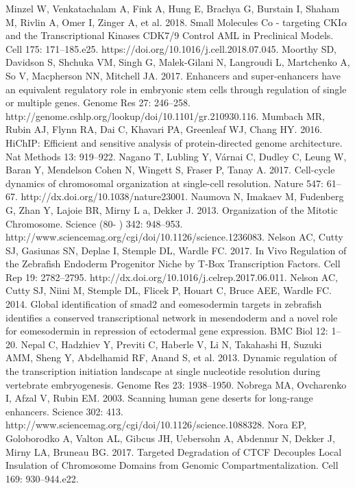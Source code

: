 \begin{thebibliography}{1}
	 Minzel W, Venkatachalam A, Fink A, Hung E, Brachya G, Burstain I, Shaham M, Rivlin A, Omer I, Zinger A, et al. 2018. Small Molecules Co - targeting CKI$\alpha$ and the Transcriptional Kinases CDK7/9 Control AML in Preclinical Models. Cell 175: 171–185.e25. https://doi.org/10.1016/j.cell.2018.07.045.
	 Moorthy SD, Davidson S, Shchuka VM, Singh G, Malek-Gilani N, Langroudi L, Martchenko A, So V, Macpherson NN, Mitchell JA. 2017. Enhancers and super-enhancers have an equivalent regulatory role in embryonic stem cells through regulation of single or multiple genes. Genome Res 27: 246–258. http://genome.cshlp.org/lookup/doi/10.1101/gr.210930.116.
	 Mumbach MR, Rubin AJ, Flynn RA, Dai C, Khavari PA, Greenleaf WJ, Chang HY. 2016. HiChIP: Efficient and sensitive analysis of protein-directed genome architecture. Nat Methods 13: 919–922.
	 Nagano T, Lubling Y, Várnai C, Dudley C, Leung W, Baran Y, Mendelson Cohen N, Wingett S, Fraser P, Tanay A. 2017. Cell-cycle dynamics of chromosomal organization at single-cell resolution. Nature 547: 61–67. http://dx.doi.org/10.1038/nature23001.
	 Naumova N, Imakaev M, Fudenberg G, Zhan Y, Lajoie BR, Mirny L a, Dekker J. 2013. Organization of the Mitotic Chromosome. Science (80- ) 342: 948–953. http://www.sciencemag.org/cgi/doi/10.1126/science.1236083.
	 Nelson AC, Cutty SJ, Gasiunas SN, Deplae I, Stemple DL, Wardle FC. 2017. In Vivo Regulation of the Zebrafish Endoderm Progenitor Niche by T-Box Transcription Factors. Cell Rep 19: 2782–2795. http://dx.doi.org/10.1016/j.celrep.2017.06.011.
	 Nelson AC, Cutty SJ, Niini M, Stemple DL, Flicek P, Houart C, Bruce AEE, Wardle FC. 2014. Global identification of smad2 and eomesodermin targets in zebrafish identifies a conserved transcriptional network in mesendoderm and a novel role for eomesodermin in repression of ectodermal gene expression. BMC Biol 12: 1–20.
	 Nepal C, Hadzhiev Y, Previti C, Haberle V, Li N, Takahashi H, Suzuki AMM, Sheng Y, Abdelhamid RF, Anand S, et al. 2013. Dynamic regulation of the transcription initiation landscape at single nucleotide resolution during vertebrate embryogenesis. Genome Res 23: 1938–1950.
	 Nobrega MA, Ovcharenko I, Afzal V, Rubin EM. 2003. Scanning human gene deserts for long-range enhancers. Science 302: 413. http://www.sciencemag.org/cgi/doi/10.1126/science.1088328.
	 Nora EP, Goloborodko A, Valton AL, Gibcus JH, Uebersohn A, Abdennur N, Dekker J, Mirny LA, Bruneau BG. 2017. Targeted Degradation of CTCF Decouples Local Insulation of Chromosome Domains from Genomic Compartmentalization. Cell 169: 930–944.e22.

\end{thebibliography}
